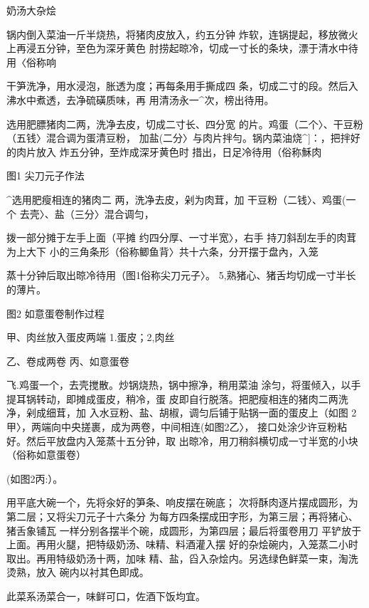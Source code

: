 \begin{recipe}{奶汤大杂烩}

\ingredients



\cooking

\step 	锅内倒入菜油一斤半烧热，将猪肉皮放入，约五分钟 炸软，连锅提起，移放微火上再浸五分钟，至色为深牙黄色 肘捞起晾冷，切成一寸长的条块，漂于清水中待用〈俗称响

\step 

\step 	干笋洗净，用水浸泡，胀透为度；再每条用手撕成四 条，切成二寸的段。然后入沸水中煮透，去净硫磺质味，再 用清汤永一^次，榜出待用。

\step 	选用肥膘猪肉二两，洗净去皮，切成二寸长、四分宽 的片。鸡蛋（二个〉、干豆粉（五钱〉混合调为蛋清豆粉， 加盐(二分〉与肉片拌勻。锅内菜油烧^]：，把拌好的肉片放入 炸五分钟，至炸成深牙黄色时 措出，日足冷待用（俗称穌肉

图1 尖刀元子作法

^选用肥瘦相连的猪肉二 两，洗净去皮，剁为肉茸，加 干豆粉（二钱〉、鸡蛋(一个 去壳〉、盐（三分〉混合调匀，

拨一部分摊于左手上面（平摊 约四分厚、一寸半宽〉，右手 持刀斜刮左手的肉茸为上大下 小的三角条形（俗称鲫鱼背〉共十六条，分开摆于盘內，入笼

蒸十分钟后取出晾冷待用（图1俗称尖刀元子〉。 5,熟猪心、猪舌均切成一寸半长的薄片。

图2 如意蛋卷制作过程

甲、肉丝放入蛋皮两端 1.蛋皮；2,肉丝

乙、卷成两卷 丙、如意蛋卷

飞.鸡蛋一个，去壳搅散。炒锅烧热，锅中擦净，稍用菜油 涂匀，将蛋倾入，以手提耳锅转动，即摊成蛋皮，稍冷，蛋 皮即自行脱落。把肥瘦相连的猪肉二两洗净，剁成细茸，加 入水豆粉、盐、胡椒，调匀后铺于贴锅一面的蛋皮上（如图 2甲〉，两端向中央搓裹，成为两卷，中间相连(如图2乙〉， 接口处涂少许豆粉粘好。然后平放盘内入笼蒸十五分钟，取 出晾冷，用刀稍斜横切成一寸半宽的小块（俗称如意蛋卷）

(如图2丙:）。

\step 用平底大碗一个，先将汆好的笋条、响皮摆在碗底； 次将酥肉逐片摆成圆形，为第二层；又将尖刀元子十六条分 为每方四条摆成田字形，为第三层；再将猪心、猪舌象铺瓦 一样分别各摆半个碗，成圆形，为第四层；最后将蛋卷用刀 平铲放于上面。再用火腿，把特级奶汤、味精、料酒灌入摆 好的杂烩碗内，入笼蒸二小时取出。再用特级奶汤十两，加味 精、盐，舀入杂烩内。另选绿色鲜菜一束，淘洗烫熟，放入 碗内以衬其色即成。

\notes

此菜系汤菜合一，味鲜可口，佐酒下饭均宜。

\end{recipe}

